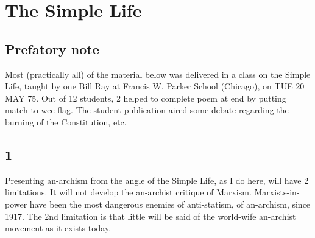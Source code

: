 \chapter{The Simple Life}

\section*{Prefatory note}
Most (practically all) of the material below was delivered in a class on the Simple Life, taught by one Bill Ray at Francis W. Parker School (Chicago), on TUE 20 MAY 75. Out of 12 students, 2 helped to complete poem at end by putting match to wee flag. The student publication aired some debate regarding the burning of the Constitution, etc.

\section*{1}
Presenting an-archism from the angle of the Simple Life, as I do here, will have 2 limitations. It will not develop the an-archist critique of Marxism. Marxists-in-power have been the most dangerous enemies of anti-statism, of an-archism, since 1917. The 2nd limitation is that little will be said of the world-wife an-archist movement as it exists today.


